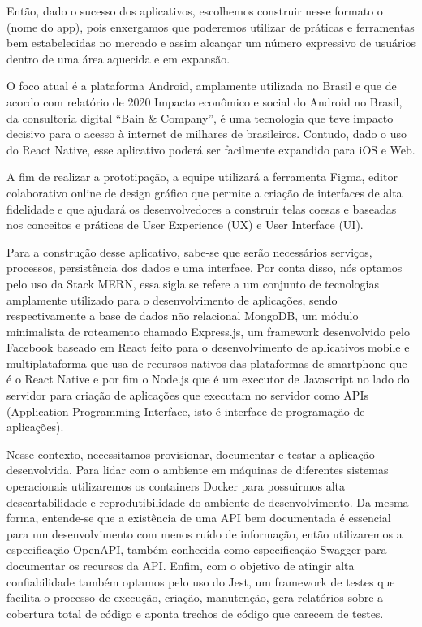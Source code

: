 \documentclass[
    12pt,               %
    openright,          %
    oneside,
    a4paper,            %
    paginasA3,  %
    BIBLATEX,           %
    REFINDENT,          %
    MODELO,             %
    TODO,               %
    english,            %
    brazil              %
    ]{ifsp-spo-inf-ctds} %
\begin{document}
\begin{apendicesenv}
Então, dado o sucesso dos aplicativos, escolhemos construir nesse formato o (nome do app), pois enxergamos que poderemos utilizar de práticas e ferramentas bem estabelecidas no mercado e assim alcançar um número expressivo de usuários dentro de uma área aquecida e em expansão.

O foco atual é a plataforma Android, amplamente utilizada no Brasil e que de acordo com relatório de 2020 Impacto econômico e social do Android no Brasil, da consultoria digital “Bain & Company”, é uma tecnologia que teve impacto decisivo para o acesso à internet de milhares de brasileiros. Contudo, dado o uso do React Native, esse aplicativo poderá ser facilmente expandido para iOS e Web.

A fim de realizar a prototipação, a equipe utilizará a ferramenta Figma, editor colaborativo online de design gráfico que permite a criação de interfaces de alta fidelidade e que ajudará os desenvolvedores a construir telas coesas e baseadas nos conceitos e práticas de User Experience (UX) e User Interface (UI).

Para a construção desse aplicativo, sabe-se que serão necessários serviços, processos, persistência dos dados e uma interface. Por conta disso, nós optamos pelo uso da Stack MERN, essa sigla se refere a um conjunto de tecnologias amplamente utilizado para o desenvolvimento de aplicações, sendo respectivamente a base de dados não relacional MongoDB, um módulo minimalista de roteamento chamado Express.js, um framework desenvolvido pelo Facebook baseado em React feito para o desenvolvimento de aplicativos mobile e multiplataforma que usa de recursos nativos das plataformas de smartphone que é o React Native e por fim o Node.js que é um executor de Javascript no lado do servidor para criação de aplicações que executam no servidor como APIs (Application Programming Interface, isto é interface de programação de aplicações).

Nesse contexto, necessitamos provisionar, documentar e testar a aplicação desenvolvida. Para lidar com o ambiente em máquinas de diferentes sistemas operacionais utilizaremos os containers Docker para possuirmos alta descartabilidade e reprodutibilidade do ambiente de desenvolvimento. Da mesma forma, entende-se que a existência de uma API bem documentada é essencial para um desenvolvimento com menos ruído de informação, então utilizaremos a especificação OpenAPI, também conhecida como especificação Swagger para documentar os recursos da API. Enfim, com o objetivo de atingir alta confiabilidade também optamos pelo uso do Jest, um framework de testes que facilita o processo de execução, criação, manutenção, gera relatórios sobre a cobertura total de código e aponta trechos de código que carecem de testes.


\end{apendicesenv}
\end{document}
